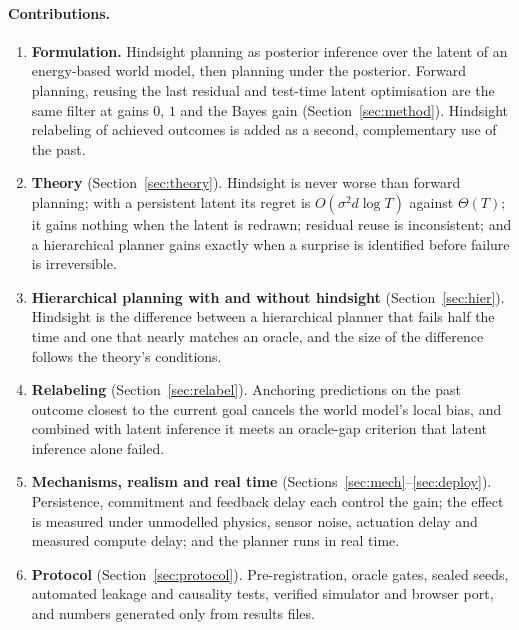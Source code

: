 \documentclass[11pt]{article}
\begin{document}
\paragraph{Contributions.}
\begin{enumerate}
\item \textbf{Formulation.} Hindsight planning as posterior inference over the latent of an energy-based world model,
then planning under the posterior. Forward planning, reusing the last residual \citep{cwm_2611_24778} and test-time
latent optimisation \citep{t2z_2610_22364} are the same filter at gains $0$, $1$ and the Bayes gain
(Section~\ref{sec:method}). Hindsight relabeling of achieved outcomes is added as a second, complementary use of the
past.
\item \textbf{Theory} (Section~\ref{sec:theory}). Hindsight is never worse than forward planning; with a persistent latent
its regret is $O(\sigma^2 d\log T)$ against $\Theta(T)$; it gains nothing when the latent is redrawn; residual reuse is
inconsistent; and a hierarchical planner gains exactly when a surprise is identified before failure is irreversible.
\item \textbf{Hierarchical planning with and without hindsight} (Section~\ref{sec:hier}). Hindsight is the difference
between a hierarchical planner that fails half the time and one that nearly matches an oracle, and the size of the
difference follows the theory's conditions.
\item \textbf{Relabeling} (Section~\ref{sec:relabel}). Anchoring predictions on the past outcome closest to the current
goal cancels the world model's local bias, and combined with latent inference it meets an oracle-gap criterion that
latent inference alone failed.
\item \textbf{Mechanisms, realism and real time} (Sections~\ref{sec:mech}--\ref{sec:deploy}). Persistence, commitment
and feedback delay each control the gain; the effect is measured under unmodelled physics, sensor noise, actuation
delay and measured compute delay; and the planner runs in real time.
\item \textbf{Protocol} (Section~\ref{sec:protocol}). Pre-registration, oracle gates, sealed seeds, automated leakage and
causality tests, verified simulator and browser port, and numbers generated only from results files.
\end{enumerate}
\end{document}
